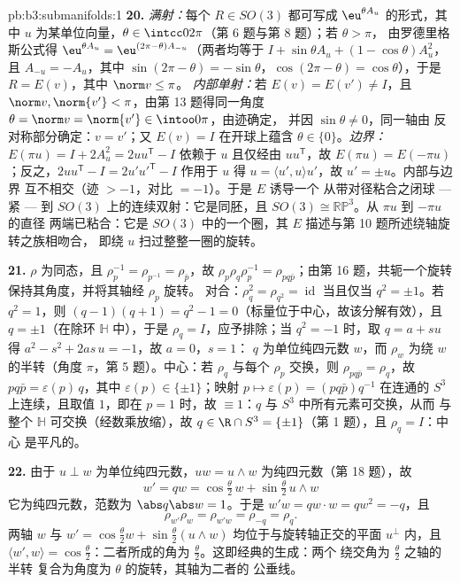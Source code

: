 \begin{solution}{pb:b3:submanifolds:1}
\textbf{20.} \emph{满射：}每个 $R \in SO(3)$ 都可写成
$\eu^{\theta A_u}$ 的形式，其中 $u$ 为某单位向量，$\theta \in
\intcc0{2\pi}$（第 6 题与第 8 题）；若 $\theta > \pi$，
由罗德里格斯公式得 $\eu^{\theta A_u} = \eu^{(2\pi -
\theta)A_{-u}}$（两者均等于 $I + \sin\theta A_u + (1 -
\cos\theta)A_u^2$，且 $A_{-u} = -A_u$，其中 $\sin(2\pi -
\theta) = -\sin\theta$，$\cos(2\pi - \theta) =
\cos\theta$），于是 $R = E(v)$，其中 $\norm v \leq \pi$。
\emph{内部单射：}若 $E(v) = E(v') \neq I$，且
$\norm v, \norm{v'} < \pi$，由第 13 题得同一角度
$\theta = \norm v = \norm{v'} \in \intoo0\pi$，由迹确定，
并因 $\sin\theta \neq 0$，同一轴由
反对称部分确定：$v = v'$；又 $E(v) = I$
在开球上蕴含 $\theta \in \{0\}$。\emph{边界：}
$E(\pi u) = I + 2A_u^2 = 2uu^{\mathsf T} - I$ 依赖于
$u$ 且仅经由 $uu^{\mathsf T}$，故 $E(\pi u) =
E(-\pi u)$；反之，$2uu^{\mathsf T} - I =
2u'u'^{\mathsf T} - I$ 作用于 $u$ 得 $u = \langle
u', u\rangle u'$，故 $u' = \pm u$。内部与边界
互不相交（迹 $> -1$，对比 $= -1$）。于是 $E$ 诱导一个
从带对径粘合之闭球
--- 紧 --- 到 $SO(3)$ 上的连续双射：它是同胚，且 $SO(3)
\cong \mathbb{RP}^3$。从 $\pi u$ 到 $-\pi u$ 的直径
两端已粘合：它是 $SO(3)$ 中的一个圈，其
$E$ 描述与第 10 题所述绕轴旋转之族相吻合，
即绕 $u$ 扫过整整一圈的旋转。

\textbf{21.} $\rho$ 为同态，且 $\rho_p^{-1} =
\rho_{p^{-1}} = \rho_{\bar p}$，故 $\rho_p\rho_q\rho_p^{-1}
= \rho_{pq\bar p}$；由第 16 题，共轭一个旋转
保持其角度，并将其轴经 $\rho_p$ 旋转。
对合：$\rho_q^2 = \rho_{q^2} = \operatorname{id}$
当且仅当 $q^2 = \pm1$。若 $q^2 = 1$，则 $(q - 1)(q + 1) = q^2 -
1 = 0$（标量位于中心，故该分解有效），且
$q = \pm1$（在除环 $\mathbb H$ 中），于是 $\rho_q
= I$，应予排除；当 $q^2 = -1$ 时，取 $q = a +
su$ 得 $a^2 - s^2 + 2as\,u = -1$，故 $a = 0$，$s = 1$：
$q$ 为单位纯四元数 $w$，而 $\rho_w$ 为绕
$w$ 的半转（角度 $\pi$，第 5 题）。中心：若 $\rho_q$
与每个 $\rho_p$ 交换，则 $\rho_{pq\bar p} = \rho_q$，故
$pq\bar p = \varepsilon(p)\,q$，其中 $\varepsilon(p) \in
\{\pm1\}$；映射 $p \mapsto \varepsilon(p) = (pq\bar p)q^{-1}$
在连通的 $S^3$ 上连续，且取值 $1$，即在 $p =
1$ 时，故 $\equiv 1$：$q$ 与 $S^3$ 中所有元素可交换，从而
与整个 $\mathbb H$ 可交换（经数乘放缩），故 $q \in \R \cap S^3 =
\{\pm1\}$（第 1 题），且 $\rho_q = I$：中心
是平凡的。

\textbf{22.} 由于 $u \perp w$ 为单位纯四元数，$uw =
u\wedge w$ 为纯四元数（第 18 题），故
\[
w' = qw = \cos\tfrac\theta2\,w + \sin\tfrac\theta2\,u\wedge
w
\]
它为纯四元数，范数为 $\abs q\abs w = 1$。于是 $w'w = qw\cdot w
= qw^2 = -q$，且
\[
\rho_{w'}\rho_w = \rho_{w'w} = \rho_{-q} = \rho_q .
\]
两轴 $w$ 与 $w' = \cos\frac\theta2 w +
\sin\frac\theta2(u\wedge w)$ 均位于与旋转轴正交的平面 $u^\perp$
内，且 $\langle w', w\rangle
= \cos\frac\theta2$：二者所成的角为
$\frac\theta2$。这即经典的生成：两个
绕交角为 $\frac\theta2$ 之轴的半转
复合为角度为 $\theta$ 的旋转，其轴为二者的
公垂线。


\end{solution}
